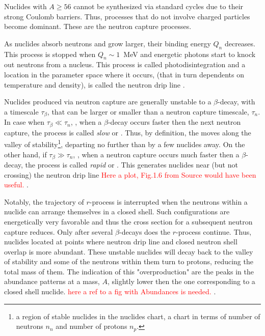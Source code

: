 Nuclides with $A\geq 56$ cannot be synthesized via standard cycles due to their strong Coulomb barriers. Thus, processes that do not involve charged particles become dominant. These are the neutron capture processes.

As nuclides absorb neutrons and grow larger, their binding energy $Q_n$ decreases. This process is stopped when $Q_n\sim1$~MeV and energetic photons start to knock out neutrons from a nucleus. This process is called photodisintegration and a location in the parameter space where it occurs, (that in turn dependents on temperature and density), is called the 
neutron drip line 
\cite{Rolfs:1988}.

Nuclides produced via neutron capture are generally unstable to a $\beta$-decay, with a timescale $\tau_{\beta}$, that can be larger or smaller than a neutron capture timescale, $\tau_n$. 
In case when $\tau_{\beta}\ll\tau_n$, \ie, when a $\beta$-decay occurs faster then the next neutron capture, the process is called \textit{slow} or \sproc{}. 
Thus, by definition, the \sproc{} moves along the valley of stability\footnote{a region of stable nuclides in the nuclides chart, a chart in terms of number of neutrons $n_n$ and number of protons $n_p$.}, departing no further than by a few nuclides away.
On the other hand, if $\tau_{\beta}\gg\tau_n$, \ie, when a neutron capture occurs much faster then a $\beta$-decay, the process is called \textit{rapid} or \rproc{}. This \nuc{} generates nuclides near (but not crossing) the neutron drip line \textcolor{red}{Here a plot, Fig.1.6 from Source would have been useful.} \citep{Rolfs:1988}. 

Notably, the trajectory of $r$-process is interrupted when the neutrons within a nuclide can arrange themselves in a closed shell. Such configurations are energetically very favorable and thus the cross section for a subsequent neutron capture reduces. Only after several $\beta$-decays does the $r$-process continue. Thus, nuclides located at points where neutron drip line and closed neutron shell overlap is more abundant. These unstable nuclides will decay back to the valley of stability and some of the neutrons within them turn to protons, reducing the total mass of them. The indication of this "overproduction" are the peaks in the abundance patterns at a mass, $A$, slightly lower then the one corresponding to a closed shell nuclide. \textcolor{red}{here a ref to a fig with Abundances is needed. }.  

